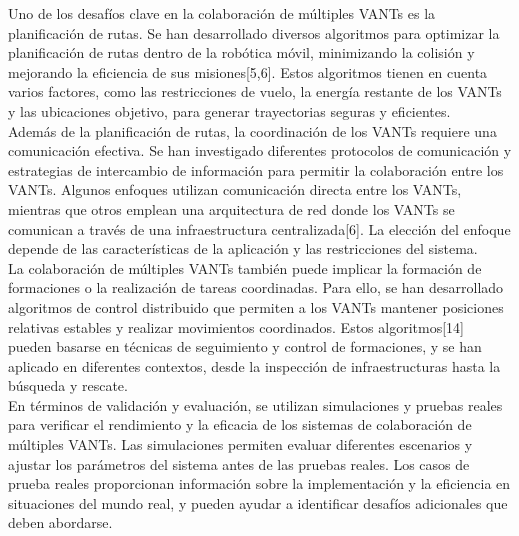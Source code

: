 \documentclass[11pt,epsf,times]{article}
\begin{document}
Uno de los desaf\'{i}os clave en la colaboraci\'{o}n de m\'{u}ltiples VANTs es la planificaci\'{o}n de rutas. Se han desarrollado diversos algoritmos para optimizar la planificaci\'{o}n de rutas dentro de la rob\'{o}tica m\'{o}vil, minimizando la colisi\'{o}n y mejorando la eficiencia de sus misiones[5,6]. Estos algoritmos tienen en cuenta varios factores, como las restricciones de vuelo, la energ\'{i}a restante de los VANTs y las ubicaciones objetivo, para generar trayectorias seguras y eficientes.\\

Adem\'{a}s de la planificaci\'{o}n de rutas, la coordinaci\'{o}n de los VANTs requiere una comunicaci\'{o}n efectiva. Se han investigado diferentes protocolos de comunicaci\'{o}n y estrategias de intercambio de informaci\'{o}n para permitir la colaboraci\'{o}n entre los VANTs. Algunos enfoques utilizan comunicaci\'{o}n directa entre los VANTs, mientras que otros emplean una arquitectura de red donde los VANTs se comunican a trav\'{e}s de una infraestructura centralizada[6]. La elecci\'{o}n del enfoque depende de las caracter\'{i}sticas de la aplicaci\'{o}n y las restricciones del sistema.\\


La colaboraci\'{o}n de m\'{u}ltiples VANTs tambi\'{e}n puede implicar la formaci\'{o}n de formaciones o la realizaci\'{o}n de tareas coordinadas. Para ello, se han desarrollado algoritmos de control distribuido que permiten a los VANTs mantener posiciones relativas estables y realizar movimientos coordinados. Estos algoritmos[14] pueden basarse en t\'{e}cnicas de seguimiento y control de formaciones, y se han aplicado en diferentes contextos, desde la inspecci\'{o}n de infraestructuras hasta la b\'{u}squeda y rescate.\\

En t\'{e}rminos de validaci\'{o}n y evaluaci\'{o}n, se utilizan simulaciones y pruebas reales para verificar el rendimiento y la eficacia de los sistemas de colaboraci\'{o}n de m\'{u}ltiples VANTs. Las simulaciones permiten evaluar diferentes escenarios y ajustar los par\'{a}metros del sistema antes de las pruebas reales. Los casos de prueba reales proporcionan informaci\'{o}n sobre la implementaci\'{o}n y la eficiencia en situaciones del mundo real, y pueden ayudar a identificar desaf\'{i}os adicionales que deben abordarse.\\
\end{document}
